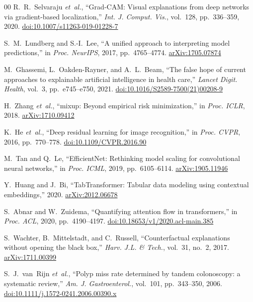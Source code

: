 \documentclass[conference]{IEEEtran}
\begin{document}
\begin{thebibliography}{00}
R.~R.~Selvaraju \emph{et~al.}, ``Grad-CAM: Visual explanations from deep
networks via gradient-based localization,''
\textit{Int. J. Comput. Vis.}, vol.~128, pp.~336--359, 2020.
\href{https://doi.org/10.1007/s11263-019-01228-7}{doi:10.1007/s11263-019-01228-7}

S.~M.~Lundberg and S.-I.~Lee, ``A unified approach to interpreting model
predictions,'' in \textit{Proc. NeurIPS}, 2017, pp.~4765--4774.
\href{https://arxiv.org/abs/1705.07874}{arXiv:1705.07874}

M.~Ghassemi, L.~Oakden-Rayner, and A.~L.~Beam, ``The false hope of current
approaches to explainable artificial intelligence in health care,''
\textit{Lancet Digit. Health}, vol.~3, pp.~e745--e750, 2021.
\href{https://doi.org/10.1016/S2589-7500(21)00208-9}{doi:10.1016/S2589-7500(21)00208-9}

H.~Zhang \emph{et~al.}, ``mixup: Beyond empirical risk minimization,''
in \textit{Proc. ICLR}, 2018.
\href{https://arxiv.org/abs/1710.09412}{arXiv:1710.09412}

K.~He \emph{et~al.}, ``Deep residual learning for image recognition,''
in \textit{Proc. CVPR}, 2016, pp.~770--778.
\href{https://doi.org/10.1109/CVPR.2016.90}{doi:10.1109/CVPR.2016.90}

M.~Tan and Q.~Le, ``EfficientNet: Rethinking model scaling for convolutional
neural networks,'' in \textit{Proc. ICML}, 2019, pp.~6105--6114.
\href{https://arxiv.org/abs/1905.11946}{arXiv:1905.11946}

Y.~Huang and J.~Bi, ``TabTransformer: Tabular data modeling using contextual
embeddings,'' 2020.
\href{https://arxiv.org/abs/2012.06678}{arXiv:2012.06678}

S.~Abnar and W.~Zuidema, ``Quantifying attention flow in transformers,''
in \textit{Proc. ACL}, 2020, pp.~4190--4197.
\href{https://doi.org/10.18653/v1/2020.acl-main.385}{doi:10.18653/v1/2020.acl-main.385}

S.~Wachter, B.~Mittelstadt, and C.~Russell,
``Counterfactual explanations without opening the black box,''
\textit{Harv. J.L. \& Tech.}, vol.~31, no.~2, 2017.
\href{https://arxiv.org/abs/1711.00399}{arXiv:1711.00399}

S.~J.~van~Rijn \emph{et~al.}, ``Polyp miss rate determined by tandem
colonoscopy: a systematic review,''
\textit{Am. J. Gastroenterol.}, vol.~101, pp.~343--350, 2006.
\href{https://doi.org/10.1111/j.1572-0241.2006.00390.x}{doi:10.1111/j.1572-0241.2006.00390.x}

\end{thebibliography}
\end{document}
